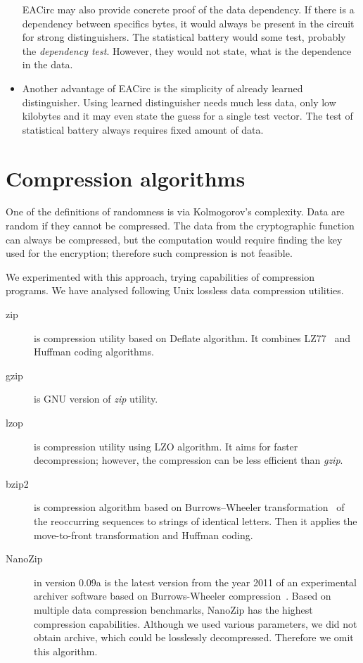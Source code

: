 \documentclass[
  print, %
  Table,   %
  nolof,     %
  nolot,     %
  11pt, %
  oneside  %
]{fithesis3}
\begin{document}
\begin{itemize}
    EACirc may also provide concrete proof of the data dependency. If there is a dependency between specifics bytes, it would always be present in the circuit for strong distinguishers. The statistical battery would some test, probably the \textit{dependency test}. However, they would not state, what is the dependence in the data.
    \item Another advantage of EACirc is the simplicity of already learned distinguisher. Using learned distinguisher needs much less data, only low kilobytes and it may even state the guess for a single test vector. The test of statistical battery always requires fixed amount of data.
\end{itemize}

\section{Compression algorithms}
\label{sec:relatwork-compress}

One of the definitions of randomness is via Kolmogorov's complexity. Data are random if they cannot be compressed. The data from the cryptographic function can always be compressed, but the computation would require finding the key used for the encryption; therefore such compression is not feasible.

We experimented with this approach, trying capabilities of compression programs. We have analysed following Unix lossless data compression utilities.

\begin{description}
    \item[zip] is compression utility based on Deflate algorithm. It combines LZ77~\cite{ziv1977universal} and Huffman coding algorithms.
    \item[gzip] is GNU version of \textit{zip} utility.
    \item[lzop] is compression utility using LZO algorithm. It aims for faster decompression; however, the compression can be less efficient than \textit{gzip}.
    \item[bzip2] is compression algorithm based on Burrows–Wheeler transformation~\cite{burrows1994block} of the reoccurring sequences to strings of identical letters. Then it applies the move-to-front transformation and Huffman coding. 
    \item[NanoZip] in version 0.09a is the latest version from the year 2011 of an experimental archiver software based on Burrows-Wheeler compression~\cite{nanozip}. Based on multiple data compression benchmarks, NanoZip has the highest compression capabilities. Although we used various parameters, we did not obtain archive, which could be losslessly decompressed. Therefore we omit this algorithm.
\end{description}
\end{document}
